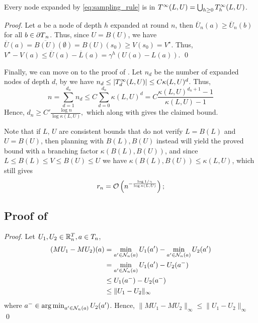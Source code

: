 \documentclass[runningheads]{llncs}
\begin{document}
\begin{lemma}
\label{lemma:expansion-tree}
Every node expanded by \eqref{eq:sampling_rule} is in $T^\infty(L,U) = \bigcup_{h\geq 0} T^\infty_h(L,U)$.
\end{lemma}
\begin{proof}
Let $a$ be a node of depth $h$ expanded at round $n$, then $\overline{U}_n(a) \geq \overline{U}_n(b)$ for all $b\in{\partial T}_n$. Thus, since $U = B(U)$, we have $\overline{U}(a) = \overline{B(U)}(\emptyset) = B(U)(s_0) \geq V(s_0) = V^\star$. Thus, $V^\star - V(a) \leq \overline{U}(a) - \overline{L}(a) = \gamma^h(U(a) - L(a))$.
\qed\end{proof}

Finally, we can move on to the proof of .
Let $n_d$ be the number of expanded nodes of depth $d$, by  we have $n_d \leq |T^\infty_d(L,U)| \leq C\kappa(L,U)^d$. Thus, 
\[n = \sum_{d=1}^{d_n} n_d \leq C\sum_{d=0}^{d_n} \kappa(L,U)^d = C\frac{\kappa(L,U)^{d_n+1}-1}{\kappa(L,U)-1}\]
Hence, $d_n \geq C'\frac{\log n}{\log\kappa(L,U)},$ which along with  gives the claimed bound.

Note that if $L,\,U$ are consistent bounds that do not verify $L = B(L)$ and $U=B(U)$, then planning with $B(L),B(U)$ instead will yield the proved bound with a branching factor $\kappa(B(L),B(U))$, and since $L\leq B(L)\leq V\leq B(U)\leq U$ we have $\kappa(B(L),B(U)) \leq \kappa(L,U)$, which still gives \begin{align*}
r_n = \mathcal{O}\left(n^{-\frac{\log 1/\gamma}{\log \kappa(L,U)}}\right);
\end{align*}

\subsection{Proof of }
\begin{proof}
Let $U_1, U_2\in \mathbb{R}^T_n, a\in T_n$,
\begin{align*}
    (M U_1 - M U_2)(a) &= \min_{a'\in\mathcal{N}_n(a)} U_1(a') - \min_{a'\in\mathcal{N}_n(a)} U_2(a') \\
    &= \min_{a'\in\mathcal{N}_n(a)} U_1(a') - U_2(a^-) \\
    &\leq U_1(a^-) - U_2(a^-) \\
    &\leq \|U_1 - U_2\|_\infty
\end{align*}
where $a^-\in \operatorname*{arg\,min}_{a'\in\mathcal{N}_n(a)} U_2(a')$. 
Hence, $\|M U_1 - M U_2\|_\infty \leq \|U_1 - U_2\|_\infty$
\qed\end{proof}
\end{document}
